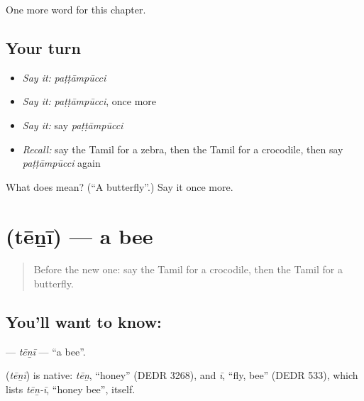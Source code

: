 \begin{grammarlens}[title={What you've built}]
One more word for this chapter.
\end{grammarlens}

\subsection*{Your turn}
\begin{itemize}
\raggedright
  \item \emph{Say it:} \emph{paṭṭāmpūcci}
  \item \emph{Say it:} \emph{paṭṭāmpūcci}, once more
  \item \emph{Say it:} say \emph{paṭṭāmpūcci}
  \item \emph{Recall:} say the Tamil for a zebra, then the Tamil for a crocodile, then say \emph{paṭṭāmpūcci} again
\end{itemize}

\begin{tcolorbox}[breakable,colback=teal!4,colframe=teal!35!black,title={Before you move on}]
What does  mean? (\textquotedblleft{}A butterfly\textquotedblright{}.) Say it once more.
\end{tcolorbox}
\section[\texorpdfstring{\ta{தேனீ} (tēṉī)}{தேனீ (tēṉī)}]{ (tēṉī) — a bee}

\label{lesson:TA-C218-teni}



\begin{quote}
Before the new one: say the Tamil for a crocodile, then the Tamil for a butterfly.
\end{quote}

\subsection*{You'll want to know: }
\textbf{} — \emph{tēṉī} — \textquotedblleft{}a bee\textquotedblright{}.

\begin{cousinweb}
\textbf{} (\emph{tēṉī}) is native: \emph{tēṉ}, \textquotedblleft{}honey\textquotedblright{} (DEDR 3268), and \emph{ī}, \textquotedblleft{}fly, bee\textquotedblright{} (DEDR 533), which lists \emph{tēṉ-ī}, \textquotedblleft{}honey bee\textquotedblright{}, itself.
\end{cousinweb}

